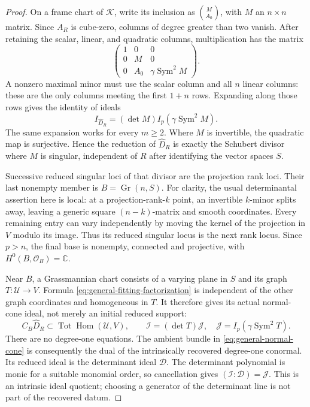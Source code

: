 \documentclass[11pt,reqno]{amsart}
\numberwithin{equation}{section}
\theoremstyle{definition}\newtheorem{definition}[theorem]{Definition}
\theoremstyle{remark}\newtheorem{remark}[theorem]{Remark}
\newcommand{\C}{\mathbb C}\newcommand{\Q}{\mathbb Q}
\newcommand{\OO}{\mathcal O}\newcommand{\II}{\mathcal I}
\DeclareMathOperator{\Sym}{Sym}\DeclareMathOperator{\Gr}{Gr}
\DeclareMathOperator{\Hom}{Hom}\DeclareMathOperator{\Tot}{Tot}
\begin{document}
\begin{proof}
On a frame chart of \(\mathcal K\), write its inclusion as
\(\binom M{A_0}\), with \(M\) an \(n\times n\) matrix.  Since
\(A_R\) is cube-zero, columns of degree greater than two vanish.
After retaining the scalar, linear, and quadratic columns, multiplication
has the matrix
\begin{equation}\label{eq:general-multiplication-matrix}
 \begin{pmatrix}
  1&0&0\\
  0&M&0\\
  0&A_0&\gamma\Sym^2M
 \end{pmatrix}.
\end{equation}
A nonzero maximal minor must use the scalar column and all \(n\)
linear columns: these are the only columns meeting the first \(1+n\)
rows.  Expanding along those rows gives the identity of ideals
\begin{equation}\label{eq:general-fitting-factorization}
 I_{\widehat D_R}=(\det M)I_p(\gamma\Sym^2M).
\end{equation}
The same expansion works for every \(m\ge2\).  Where \(M\) is
invertible, the quadratic map is surjective.  Hence the reduction of
\(\widehat D_R\) is exactly the Schubert divisor where \(M\)
is singular, independent of \(R\) after identifying the vector
spaces \(S\).

Successive reduced singular loci of that divisor are the projection
rank loci.  Their last nonempty member is \(B=\Gr(n,S)\).
For clarity, the usual determinantal assertion here is local: at a
projection-rank-\(k\) point, an invertible \(k\)-minor splits
away, leaving a generic square \((n-k)\)-matrix and smooth
coordinates.  Every remaining entry can vary independently by
moving the kernel of the projection in \(V\) modulo its image.
Thus its reduced singular locus is the next rank locus.  Since
\(p>n\), the final base is nonempty, connected and projective,
with \(H^0(B,\OO_B)=\C\).

Near \(B\), a Grassmannian chart consists of a varying plane in
\(S\) and its graph \(T:\mathcal U\to V\).  Formula
\eqref{eq:general-fitting-factorization} is independent of the other
graph coordinates and homogeneous in \(T\).  It therefore gives
its actual normal-cone ideal, not merely an initial reduced support:
\begin{equation}\label{eq:general-normal-cone}
 C_B\widehat D_R\subset\Tot\Hom(\mathcal U,V),\qquad
 \mathcal I=(\det T)\mathcal J,\quad
 \mathcal J=I_p(\gamma\Sym^2T).
\end{equation}
There are no degree-one equations.  The ambient bundle in
\eqref{eq:general-normal-cone} is consequently the dual of the
intrinsically recovered degree-one conormal.  Its reduced ideal is
the determinant ideal \(\mathcal D\).  The determinant polynomial
is monic for a suitable monomial order, so cancellation gives
\((\mathcal I:\mathcal D)=\mathcal J\).  This is an intrinsic
ideal quotient; choosing a generator of the determinant line is not
part of the recovered datum.


\end{proof}
\end{document}

